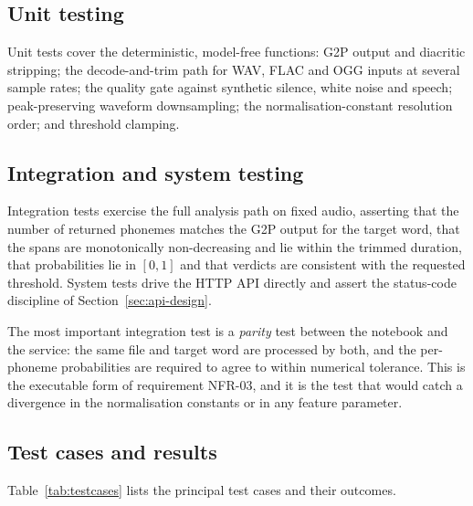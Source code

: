 \subsection{Unit testing}

Unit tests cover the deterministic, model-free functions: G2P output and
diacritic stripping; the decode-and-trim path for WAV, FLAC and OGG inputs at
several sample rates; the quality gate against synthetic silence, white noise
and speech; peak-preserving waveform downsampling; the normalisation-constant
resolution order; and threshold clamping.

\subsection{Integration and system testing}

Integration tests exercise the full analysis path on fixed audio, asserting that
the number of returned phonemes matches the G2P output for the target word, that
the spans are monotonically non-decreasing and lie within the trimmed duration,
that probabilities lie in $[0,1]$ and that verdicts are consistent with the
requested threshold. System tests drive the HTTP API directly and assert the
status-code discipline of Section~\ref{sec:api-design}.

The most important integration test is a \emph{parity} test between the notebook
and the service: the same file and target word are processed by both, and the
per-phoneme probabilities are required to agree to within numerical tolerance.
This is the executable form of requirement NFR-03, and it is the test that would
catch a divergence in the normalisation constants or in any feature parameter.

\subsection{Test cases and results}

Table~\ref{tab:testcases} lists the principal test cases and their outcomes.

